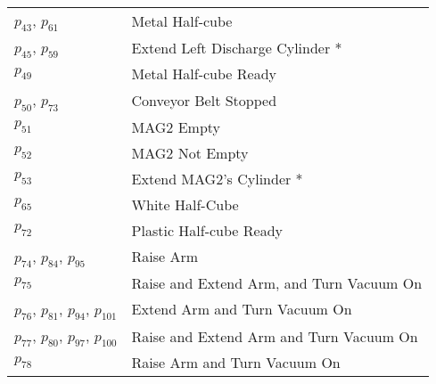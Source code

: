 \begin{longtable}{M{5cm}M{10cm}}
\hyperlink{completeNet:p43}{\hypertarget{completeTable:p43}{$p_{43}$}}, \hyperlink{completeNet:p61}{\hypertarget{completeTable:p61}{$p_{61}$}} & Metal Half-cube\\
\hyperlink{completeNet:p45}{\hypertarget{completeTable:p45}{$p_{45}$}}, \hyperlink{completeNet:p59}{\hypertarget{completeTable:p59}{$p_{59}$}} & Extend Left Discharge Cylinder *\\
\hyperlink{completeNet:p49}{\hypertarget{completeTable:p49}{$p_{49}$}} & Metal Half-cube Ready\\
\hyperlink{completeNet:p50}{\hypertarget{completeTable:p50}{$p_{50}$}}, \hyperlink{completeNet:p73}{\hypertarget{completeTable:p73}{$p_{73}$}} & Conveyor Belt Stopped\\
\hyperlink{completeNet:p51}{\hypertarget{completeTable:p51}{$p_{51}$}} & MAG2 Empty\\
\hyperlink{completeNet:p52}{\hypertarget{completeTable:p52}{$p_{52}$}} & MAG2 Not Empty\\
\hyperlink{completeNet:p53}{\hypertarget{completeTable:p53}{$p_{53}$}} & Extend MAG2's Cylinder *\\
\hyperlink{completeNet:p65}{\hypertarget{completeTable:p65}{$p_{65}$}} & White Half-Cube\\
\hyperlink{completeNet:p72}{\hypertarget{completeTable:p72}{$p_{72}$}} & Plastic Half-cube Ready\\
\hyperlink{completeNet:p74}{\hypertarget{completeTable:p74}{$p_{74}$}}, \hyperlink{completeNet:p84}{\hypertarget{completeTable:p84}{$p_{84}$}}, \hyperlink{completeNet:p95}{\hypertarget{completeTable:p95}{$p_{95}$}} & Raise Arm\\
\hyperlink{completeNet:p75}{\hypertarget{completeTable:p75}{$p_{75}$}} & Raise and Extend Arm, and Turn Vacuum On\\
\hyperlink{completeNet:p76}{\hypertarget{completeTable:p76}{$p_{76}$}}, \hyperlink{completeNet:p81}{\hypertarget{completeTable:p81}{$p_{81}$}}, \hyperlink{completeNet:p94}{\hypertarget{completeTable:p94}{$p_{94}$}}, \hyperlink{completeNet:p101}{\hypertarget{completeTable:p101}{$p_{101}$}} & Extend Arm and Turn Vacuum On\\
\hyperlink{completeNet:p77}{\hypertarget{completeTable:p77}{$p_{77}$}}, \hyperlink{completeNet:p80}{\hypertarget{completeTable:p80}{$p_{80}$}}, \hyperlink{completeNet:p97}{\hypertarget{completeTable:p97}{$p_{97}$}}, \hyperlink{completeNet:p100}{\hypertarget{completeTable:p100}{$p_{100}$}} & Raise and Extend Arm and Turn Vacuum On\\
\hyperlink{completeNet:p78}{\hypertarget{completeTable:p78}{$p_{78}$}} & Raise Arm and Turn Vacuum On\\

\end{longtable}
